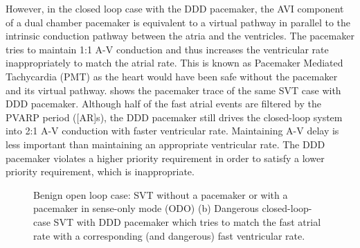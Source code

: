 However, in the closed loop case with the DDD pacemaker, the AVI component of a dual chamber pacemaker is equivalent to a virtual pathway in parallel to the intrinsic conduction pathway between the atria and the ventricles. The pacemaker tries to maintain 1:1 A-V conduction and thus increases the ventricular rate inappropriately to match the atrial rate.  This is known as Pacemaker Mediated Tachycardia (PMT) as the heart would have been safe without the pacemaker and its virtual pathway.  shows the pacemaker trace of the same SVT case with DDD pacemaker. Although half of the fast atrial events are filtered by the PVARP period ([AR]s), the DDD pacemaker still drives the closed-loop system into 2:1 A-V conduction with faster ventricular rate. Maintaining A-V delay is less important than maintaining an appropriate ventricular rate. The DDD pacemaker violates a higher priority requirement in order to satisfy a lower priority requirement, which is inappropriate.
\begin{figure}[!t]
\centering
\vspace{-10pt}
		
\vspace{-5pt}
\caption{\small Benign open loop case: SVT without a pacemaker or with a pacemaker in sense-only mode (ODO) (b) Dangerous closed-loop-case SVT with DDD pacemaker which tries to match the fast atrial rate with a corresponding (and dangerous) fast ventricular rate.}
\vspace{-10pt}
\end{figure} 

